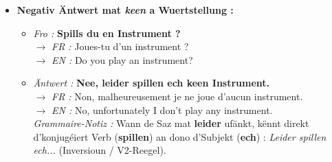 \begin{itemize}
    \item \textbf{Negativ Äntwert mat \textit{keen} a Wuertstellung :}
    \begin{itemize}
        \item \textit{Fro :} \textbf{Spills du en Instrument ?} \\
        $\rightarrow$ \textit{FR :} Joues-tu d'un instrument ? \\
        $\rightarrow$ \textit{EN :} Do you play an instrument?
        \item \textit{Äntwert :} \textbf{Nee, leider spillen ech keen Instrument.} \\
        $\rightarrow$ \textit{FR :} Non, malheureusement je ne joue d'aucun instrument. \\
        $\rightarrow$ \textit{EN :} No, unfortunately I don't play any instrument. \\
        \textit{Grammaire-Notiz :} Wann de Saz mat \textbf{leider} ufänkt, kënnt direkt d'konjugéiert Verb (\textbf{spillen}) an dono d'Subjekt (\textbf{ech}) : \textit{Leider spillen ech...} (Inversioun / V2-Reegel).
    \end{itemize}

    \vspace{0.4em}


\end{itemize}
